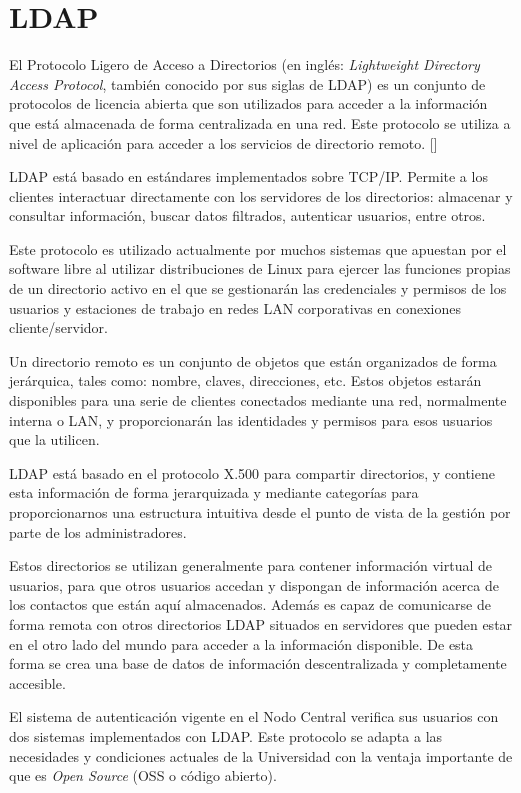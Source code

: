 \section{LDAP}
El Protocolo Ligero de Acceso a Directorios (en inglés: \textit{Lightweight Directory Access Protocol}, también conocido por sus siglas de LDAP) es un conjunto de protocolos de licencia abierta que son utilizados para acceder a la información que está almacenada de forma centralizada en una red. Este protocolo se utiliza a nivel de aplicación para acceder a los servicios de directorio remoto. [\cite{ldap-doc}]

LDAP está basado en estándares implementados sobre TCP/IP. Permite a los clientes interactuar directamente con los servidores de los directorios: almacenar y consultar información, buscar datos filtrados, autenticar usuarios, entre otros.

Este protocolo es utilizado actualmente por muchos sistemas que apuestan por el software libre al utilizar distribuciones de Linux para ejercer las funciones propias de un directorio activo en el que se gestionarán las credenciales y permisos de los usuarios y estaciones de trabajo en redes LAN corporativas en conexiones cliente/servidor.

Un directorio remoto es un conjunto de objetos que están organizados de forma jerárquica, tales como: nombre, claves, direcciones, etc. Estos objetos estarán disponibles para una serie de clientes conectados mediante una red, normalmente interna o LAN, y proporcionarán las identidades y permisos para esos usuarios que la utilicen.

LDAP está basado en el protocolo X.500 para compartir directorios, y contiene esta información de forma jerarquizada y mediante categorías para proporcionarnos una estructura intuitiva desde el punto de vista de la gestión por parte de los administradores.

Estos directorios se utilizan generalmente para contener información virtual de usuarios, para que otros usuarios accedan y dispongan de información acerca de los contactos que están aquí almacenados. Además es capaz de comunicarse de forma remota con otros directorios LDAP situados en servidores que pueden estar en el otro lado del mundo para acceder a la información disponible. De esta forma se crea una base de datos de información descentralizada y completamente accesible.
 
El sistema de autenticación vigente en el Nodo Central verifica sus usuarios con dos sistemas implementados con LDAP. Este protocolo se adapta a las necesidades y condiciones actuales de la Universidad con la ventaja importante de que es \textit{Open Source} (OSS o código abierto).


